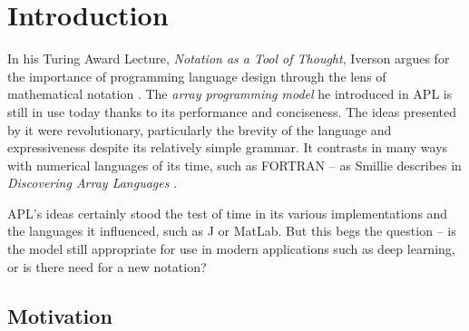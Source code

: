 \chapter{Introduction}

In his Turing Award Lecture, \textit{Notation as a Tool of Thought}, Iverson argues for the importance of programming language design through the lens of mathematical notation  \cite{iverson2007notation}. The \textit{array programming model} he introduced in APL is still in use today thanks to its performance and conciseness. The ideas presented by it were revolutionary, particularly the brevity of the language and expressiveness despite its relatively simple grammar. It contrasts in many ways with numerical languages of its time, such as FORTRAN -- as Smillie describes in \textit{Discovering Array Languages} \cite{smillie2000lecture}. 

APL's ideas certainly stood the test of time in its various implementations and the languages it influenced, such as J or MatLab. But this begs the question -- is the model still appropriate for use in modern applications such as deep learning, or is there need for a new notation?

\section{Motivation}


